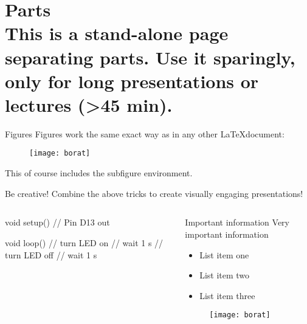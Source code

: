 \documentclass{beamer}
\begin{document}
\part{{\bf Parts} \protect\\ This is a stand-alone page separating parts. Use it sparingly, only for long presentations or lectures (>45 min).}
\frame{\partpage}

\begin{frame}{Figures}
Figures work the same exact way as in any other \LaTeX document:
\begin{figure}
\centering
  \texttt{[image: borat]}\\
\end{figure}
This of course includes the subfigure environment.
\end{frame}




\begin{frame}[fragile]{Be creative!}
Combine the above tricks to create visually engaging presentations!
\begin{columns}[T] %
\begin{column}{.48\textwidth}
\begin{ardu}
void setup() {
     // Pin D13 out
}

void loop() {
     // turn LED on
     // wait 1 s
     // turn LED off
     // wait 1 s
}
\end{ardu}
\end{column}
\begin{column}{.48\textwidth}
\begin{block}{Important information}
Very important information
\end{block}
\begin{itemize}
\item List item one
\item List item two
\item List item three
\end{itemize}
\begin{figure}
\centering
  \texttt{[image: borat]}\\
\end{figure}
\end{column}%
\end{columns}
\end{frame}
\end{document}
